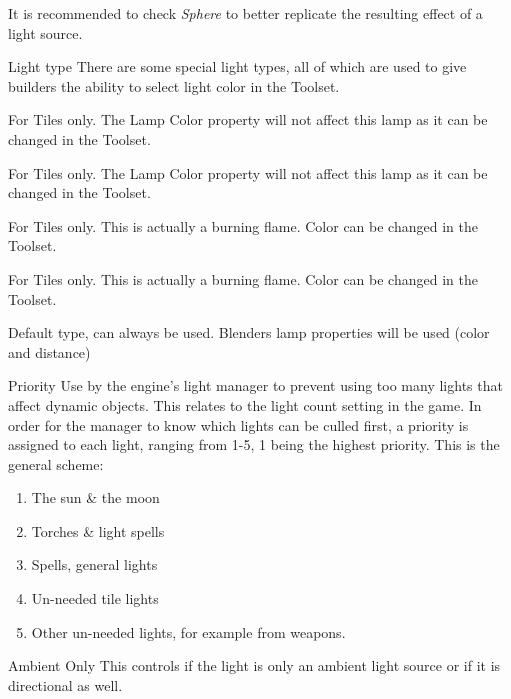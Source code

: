 It is recommended to check \textit{Sphere} to better replicate the resulting effect 
of a light source.

\begin{propertyAurora}{Light type}
There are some special light types, all of which are used to give builders
the ability to select light color in the Toolset.
\begin{description}[leftmargin=8em,style=nextline]
    \item[Mainlight 1] For Tiles only. The Lamp Color property will not affect this lamp as it can be changed in the Toolset.
    \item[Mainlight 2] For Tiles only. The Lamp Color property will not affect this lamp as it can be changed in the Toolset.
    \item[Sourcelight 1] For Tiles only. This is actually a burning flame. Color can be changed in the Toolset.
    \item[Sourcelight 2] For Tiles only. This is actually a burning flame. Color can be changed in the Toolset.
    \item[Default] Default type, can always be used. Blenders lamp properties will be used (color and distance)
\end{description}
\end{propertyAurora}

\begin{propertyAurora}{Priority}
Use by the engine's light manager to prevent using too many lights that affect dynamic 
objects. This relates to the light count setting in the game. In order for the manager 
to know which lights can be culled first, a priority is assigned to each light, ranging from 1-5, 
1 being the highest priority. This is the general scheme:
\begin{enumerate}
    \item The sun \& the moon
    \item Torches \& light spells
    \item Spells, general lights
    \item Un-needed tile lights
    \item Other un-needed lights, for example from weapons.
\end{enumerate}
\end{propertyAurora}

\begin{propertyAurora}{Ambient Only}
This controls if the light is only an ambient light source or
if it is directional as well.
\end{propertyAurora}

